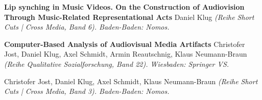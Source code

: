 \documentclass[9pt]{article}
\begin{document}





\noindent\textbf{Lip synching in Music Videos. On the Construction of Audiovision}\vspace{-0.03in}
\newline\noindent\textbf{Through Music-Related Representational Acts}\dates{}
\newline{}\dates{}\vspace{-0.03in}
\newline{}
\newline\noindent Daniel Klug
\newline\noindent\emph{(Reihe Short Cuts | Cross Media, Band 6). Baden-Baden: Nomos.}
\bigskip


\noindent\textbf{Computer-Based Analysis of Audiovisual Media Artifacts}
\newline{}\dates{}
\newline\noindent Christofer Jost, Daniel Klug, Axel Schmidt, Armin Reautschnig, Klaus Neumann-Braun
\newline\noindent\emph{(Reihe Qualitative Sozialforschung, Band 22). Wiesbaden: Springer VS.}
\bigskip



\vspace{-0.03in}
\newline{}
\newline{}\vspace{-0.03in}
\newline{}
\newline\noindent Christofer Jost, Daniel Klug, Axel Schmidt, Klaus Neumann-Braun
\newline\noindent\emph{(Reihe Short Cuts | Cross Media, Band 3). Baden-Baden: Nomos.}
\bigskip
\end{document}
